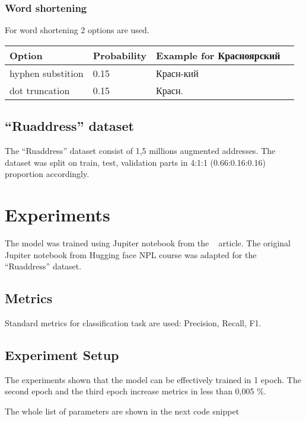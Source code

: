 \documentclass{article}
\begin{document}
\subsubsection{Word shortening}

For word shortening 2 options are used.


\begin{center}
    \begin{tabular}{| l | l | l |  l | }
        \hline
        Option & Probability & Example for Красноярский & \\
        \hline
        hyphen substition & 0.15 & Красн-кий  \\
        dot truncation & 0.15 & Красн.  \\
        \hline
    \end{tabular}
\end{center}


\subsection{``Ruaddress'' dataset}

The ``Ruaddress'' dataset consist of 1,5 millions augmented addresses.
The dataset was split on train, test, validation parts in 4:1:1 (0.66:0.16:0.16) proportion accordingly.


\section{Experiments}

The model was trained using Jupiter notebook  from the ~\cite{nlpcourse2022} article.
The original Jupiter notebook from Hugging face NPL course was adapted for the ``Ruaddress'' dataset.



\subsection{Metrics}
Standard metrics for classification task are used: Precision, Recall, F1.

\subsection{Experiment Setup}

The experiments shown that the model can be effectively trained in 1 epoch.
The second epoch and the third epoch increase metrics in less than 0,005 \%.

The whole list of parameters are shown in the next code snippet
\end{document}
